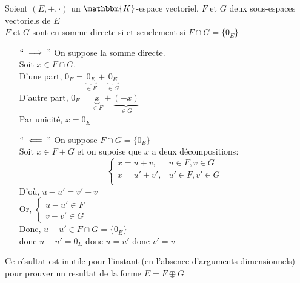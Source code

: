 \begin{prop}
	Soient $(E,+,\cdot)$ un $\mathbbm{K}$-espace vectoriel, $F$ et $G$ deux sous-espaces vectoriels de $E$\\
	$F$ et $G$ sont en somme directe si et seuelement si $F \cap G = \{0_E\}$
\end{prop}

\begin{prv}
	\begin{itemize}
		\item[$``\implies"$] On suppose la somme directe.\\
			Soit $x \in F \cap G$.\\
			D'une part, $0_E = \underbrace{0_E}_{\in F} + \underbrace{0_E}_{\in G}$\\
			D'autre part, $0_E = \underbrace{x}_{\in F} + \underbrace{(-x)}_{\in G}$ \\
			Par unicité, $x = 0_E$ 
		\item[$``\impliedby"$] On suppose $F \cap G = \{0_E\}$ \\
			Soit $x \in F + G$ et on supoise que $x$ a deux décompositions: \[
				\begin{cases}
					x = u + v, &u \in F, v \in G\\
					x = u' + v', &u'\in F, v' \in G\\
				\end{cases}
			\]
			D'où, $u - u' = v' - v$ \\
			Or, $\begin{cases}
				 u - u' \in F\\
				 v - v' \in G
			\end{cases}$\\
			Donc, $u - u' \in F \cap G = \{0_E\}$ \\
			donc $u - u' = 0_E$ donc $u = u'$ donc $v' = v$
	\end{itemize}
\end{prv}

\begin{rmk}
	Ce résultat est inutile pour l'instant (en l'absence d'arguments dimensionnels) pour prouver un resultat de la forme $E = F \oplus G$ \\
\end{rmk}

